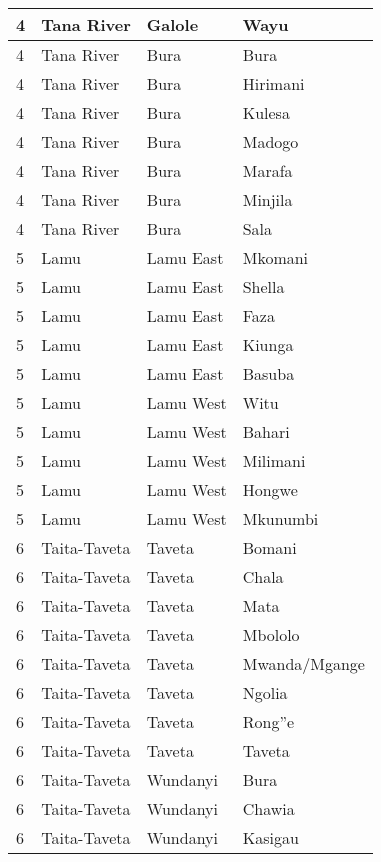 \begin{table}[!ht]
\begin{tabular}{|l|l|l|l|}
        4 & Tana River & Galole & Wayu \\ \hline
        4 & Tana River & Bura & Bura \\ \hline
        4 & Tana River & Bura & Hirimani \\ \hline
        4 & Tana River & Bura & Kulesa \\ \hline
        4 & Tana River & Bura & Madogo \\ \hline
        4 & Tana River & Bura & Marafa \\ \hline
        4 & Tana River & Bura & Minjila \\ \hline
        4 & Tana River & Bura & Sala \\ \hline
        5 & Lamu & Lamu East & Mkomani \\ \hline
        5 & Lamu & Lamu East & Shella \\ \hline
        5 & Lamu & Lamu East & Faza \\ \hline
        5 & Lamu & Lamu East & Kiunga \\ \hline
        5 & Lamu & Lamu East & Basuba \\ \hline
        5 & Lamu & Lamu West & Witu \\ \hline
        5 & Lamu & Lamu West & Bahari \\ \hline
        5 & Lamu & Lamu West & Milimani \\ \hline
        5 & Lamu & Lamu West & Hongwe \\ \hline
        5 & Lamu & Lamu West & Mkunumbi \\ \hline
        6 & Taita-Taveta & Taveta & Bomani \\ \hline
        6 & Taita-Taveta & Taveta & Chala \\ \hline
        6 & Taita-Taveta & Taveta & Mata \\ \hline
        6 & Taita-Taveta & Taveta & Mbololo \\ \hline
        6 & Taita-Taveta & Taveta & Mwanda/Mgange \\ \hline
        6 & Taita-Taveta & Taveta & Ngolia \\ \hline
        6 & Taita-Taveta & Taveta & Rong''e \\ \hline
        6 & Taita-Taveta & Taveta & Taveta \\ \hline
        6 & Taita-Taveta & Wundanyi & Bura \\ \hline
        6 & Taita-Taveta & Wundanyi & Chawia \\ \hline
        6 & Taita-Taveta & Wundanyi & Kasigau \\ \hline

\end{tabular}
\end{table}
